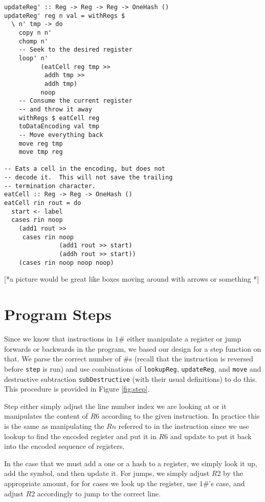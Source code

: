 \documentclass[10pt, preprint, nocopyrightspace]{sigplanconf}
\newcommand{\oh}{$1\#$\xspace}
\newcommand{\figref}[1]{Figure \ref{#1}}
\begin{document}
\begin{minipage}{.48\textwidth}
\begin{lstlisting}
updateReg' :: Reg -> Reg -> Reg -> OneHash ()
updateReg' reg n val = withRegs $
  \ n' tmp -> do
    copy n n'
    chomp n'
    -- Seek to the desired register
    loop' n'
          (eatCell reg tmp >>
           addh tmp >>
           addh tmp)
          noop
    -- Consume the current register
    -- and throw it away
    withRegs $ eatCell reg
    toDataEncoding val tmp
    -- Move everything back
    move reg tmp
    move tmp reg

-- Eats a cell in the encoding, but does not
-- decode it.  This will not save the trailing
-- termination character.
eatCell :: Reg -> Reg -> OneHash ()
eatCell rin rout = do
  start <- label
  cases rin noop
    (add1 rout >>
     cases rin noop
               (add1 rout >> start)
               (addh rout >> start))
    (cases rin noop noop noop)
\end{lstlisting}
\end{minipage}

[*a picture would be great like boxes moving around with arrows or something *]

\section{Program Steps}

Since we know that instructions in \oh either manipulate a register or jump
forwards or backwards in the program, we based our design for a step function on
that. We parse the correct number of $\#$s (recall that the instruction is
reversed before \lstinline{step} is run) and use combinations of
\lstinline{lookupReg}, \lstinline{updateReg}, and \lstinline{move} and
destructive subtraction \lstinline{subDestructive} (with their usual
definitions) to do this. This procedure is provided in \figref{fig:step}. 

Step either simply adjust the line number index we are looking at or it
manipulates the content of $R6$ according to the given instruction. 
In practice this is the same as manipulating the $Rn$ referred to in the
instruction since we use lookup to find the encoded register and put it in $R6$
and update to put it back into the encoded sequence of registers. 

In the case that we must add a one or a hash to a
register, we simply look it up, add the symbol, and then update it. For jumps,
we simply adjust $R2$ by the appropriate amount, for for cases we look up the
register, use \oh's case, and adjust $R2$ accordingly to jump to the correct
line.
\end{document}
